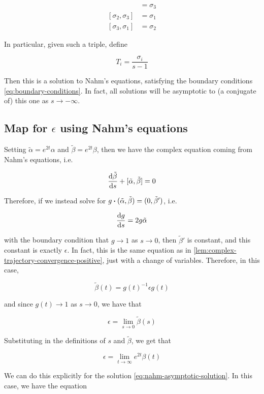 \documentclass{report}
\begin{document}
\begin{align*}
    [\sigma_1, \sigma_2] &= \sigma_3 \\
    [\sigma_2, \sigma_3] &= \sigma_1 \\
    [\sigma_3, \sigma_1] &= \sigma_2
\end{align*}

In particular, given such a triple, define

\begin{equation}
    \label{eq:nahm-asymptotic-solution}
    T_i = \frac{\sigma_i}{s-1}
\end{equation}

Then this is a solution to Nahm's equations, satisfying the boundary conditions \cref{eq:boundary-conditions}. In fact, all solutions will be asymptotic to (a conjugate of) this one as \(s \to -\infty\).

\subsection{Map for \(\epsilon\) using Nahm's equations}

Setting \(\tilde\alpha = e^{2t}\alpha\) and \(\tilde\beta = e^{2t}\beta\), then we have the complex equation coming from Nahm's equations, i.e.

\[\dv{\tilde\beta}{s} + [\tilde\alpha, \tilde\beta] = 0\]

Therefore, if we instead solve for \(g \vdot (\tilde\alpha, \tilde\beta) = (0, \tilde\beta')\), i.e.

\[\dv{g}{s} = 2g\tilde\alpha\]

with the boundary condition that \(g \to 1\) as \(s \to 0\), then \(\tilde\beta'\) is constant, and this constant is exactly \(\epsilon\). In fact, this is the same equation as in \cref{lem:complex-trajectory-convergence-positive}, just with a change of variables. Therefore, in this case,

\[\tilde\beta(t) = g(t)^{-1}\epsilon g(t)\]

and since \(g(t) \to 1\) as \(s \to 0\), we have that

\[\epsilon = \lim_{s \to 0}\tilde\beta(s)\]

Substituting in the definitions of \(s\) and \(\tilde\beta\), we get that

\[\epsilon = \lim_{t \to \infty}e^{2t}\beta(t)\]

We can do this explicitly for the solution \cref{eq:nahm-asymptotic-solution}. In this case, we have the equation
\end{document}
